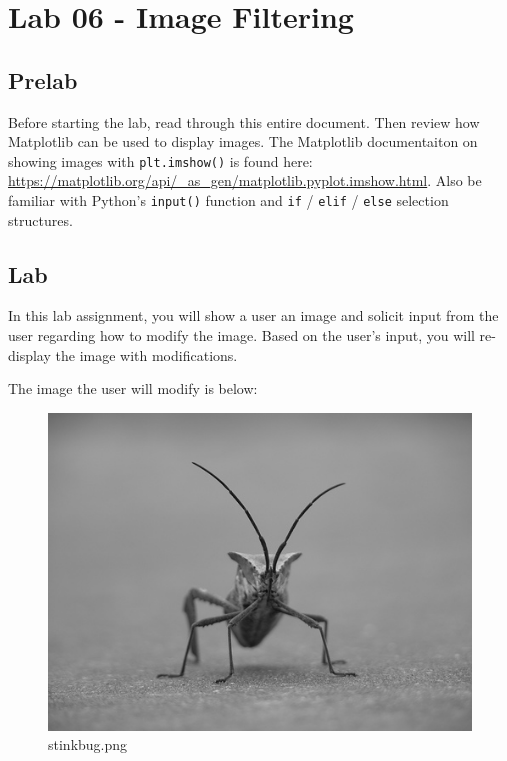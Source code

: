 \documentclass[11pt]{article}
\begin{document}
  
\hypertarget{lab-06---image-filtering}{%
\section{Lab 06 - Image Filtering}\label{lab-06---image-filtering}}

\hypertarget{prelab}{%
\subsection{Prelab}\label{prelab}}

Before starting the lab, read through this entire document. Then review
how Matplotlib can be used to display images. The Matplotlib
documentaiton on showing images with \texttt{plt.imshow()} is found
here:
\url{https://matplotlib.org/api/_as_gen/matplotlib.pyplot.imshow.html}.
Also be familiar with Python's \texttt{input()} function and \texttt{if}
/ \texttt{elif} / \texttt{else} selection structures.

\hypertarget{lab}{%
\subsection{Lab}\label{lab}}

In this lab assignment, you will show a user an image and solicit input
from the user regarding how to modify the image. Based on the user's
input, you will re-display the image with modifications.

The image the user will modify is below:

\begin{figure}[!h]
\centering
\includegraphics[scale=0.3]{stinkbug.png}
\caption{stinkbug.png}
\end{figure}
\end{document}
